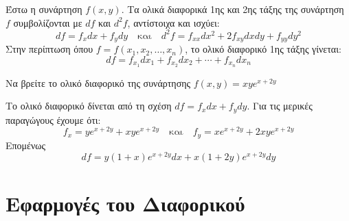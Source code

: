    \begin{dfn}
      Έστω η συνάρτηση $ f(x,y) $. Τα \textcolor{Col1}{ολικά διαφορικά 1ης και 
      2ης τάξης} της συνάρτηση $f$ συμβολίζονται με $ df $ και $ d^{2}f $, αντίστοιχα 
      και ισχύει:
      \[
        \boxed{df = f_{x}dx + f_{y}dy} \quad \text{και} \quad 
        \boxed{d^{2}f = f_{xx}dx^{2}+2f_{xy}dxdy+f_{yy}dy^{2}}
      \] 
      Στην περίπτωση όπου $ f= f(x_{1}, x_{2}, \ldots, x_{n}) $, το ολικό 
      διαφορικό 1ης τάξης γίνεται: 
      \[
        df = f_{x_{1}}d{x_{1}} + f_{x_{2}}d{x_{2}} + \cdots + f_{x_{n}} dx_{n}
      \]
    \end{dfn}



    \begin{example}
      Να βρείτε το ολικό διαφορικό της συνάρτησης $ f(x,y) = xye^{x+2y} $ 
      \begin{solution}
      \item {}
        Το ολικό διαφορικό δίνεται από τη σχέση $ df = f_{x} dx + f_{y} dy $.  
        Για τις μερικές παραγώγους έχουμε ότι: 
        \[
          f_{x} = ye^{x+2y}+xye^{x+2y} \quad \text{και} \quad f_{y} = xe^{x+2y} +
          2xye^{x+2y}
        \] 
        Επομένως
        \[
          df = y(1+x)e^{x+2y} dx + x(1+2y)e^{x+2y}dy
        \]
      \end{solution}
    \end{example}

    \section{Εφαρμογές του Διαφορικού}

